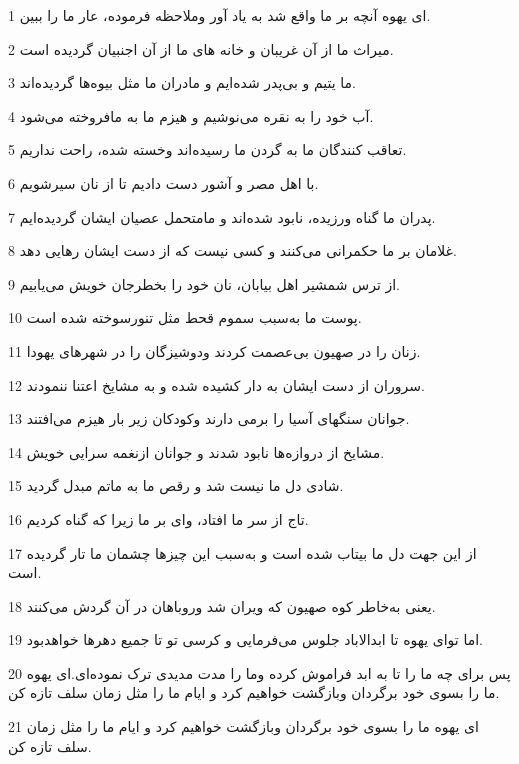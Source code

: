 \par 1 ای یهوه آنچه بر ما واقع شد به یاد آور وملاحظه فرموده، عار ما را ببین.
\par 2 میراث ما از آن غریبان و خانه های ما از آن اجنبیان گردیده است.
\par 3 ما یتیم و بی‌پدر شده‌ایم و مادران ما مثل بیوه‌ها گردیده‌اند.
\par 4 آب خود را به نقره می‌نوشیم و هیزم ما به مافروخته می‌شود.
\par 5 تعاقب کنندگان ما به گردن ما رسیده‌اند وخسته شده، راحت نداریم.
\par 6 با اهل مصر و آشور دست دادیم تا از نان سیرشویم.
\par 7 پدران ما گناه ورزیده، نابود شده‌اند و مامتحمل عصیان ایشان گردیده‌ایم.
\par 8 غلامان بر ما حکمرانی می‌کنند و کسی نیست که از دست ایشان رهایی دهد.
\par 9 از ترس شمشیر اهل بیابان، نان خود را بخطرجان خویش می‌یابیم.
\par 10 پوست ما به‌سبب سموم قحط مثل تنورسوخته شده است.
\par 11 زنان را در صهیون بی‌عصمت کردند ودوشیزگان را در شهرهای یهودا.
\par 12 سروران از دست ایشان به دار کشیده شده و به مشایخ اعتنا ننمودند.
\par 13 جوانان سنگهای آسیا را برمی دارند وکودکان زیر بار هیزم می‌افتند.
\par 14 مشایخ از دروازه‌ها نابود شدند و جوانان ازنغمه سرایی خویش.
\par 15 شادی دل ما نیست شد و رقص ما به ماتم مبدل گردید.
\par 16 تاج از سر ما افتاد، وای بر ما زیرا که گناه کردیم.
\par 17 از این جهت دل ما بیتاب شده است و به‌سبب این چیزها چشمان ما تار گردیده است.
\par 18 یعنی به‌خاطر کوه صهیون که ویران شد وروباهان در آن گردش می‌کنند.
\par 19 اما تو‌ای یهوه تا ابدالاباد جلوس می‌فرمایی و کرسی تو تا جمیع دهرها خواهدبود.
\par 20 پس برای چه ما را تا به ابد فراموش کرده وما را مدت مدیدی ترک نموده‌ای.‌ای یهوه ما را بسوی خود برگردان وبازگشت خواهیم کرد و ایام ما را مثل زمان سلف تازه کن.
\par 21 ‌ای یهوه ما را بسوی خود برگردان وبازگشت خواهیم کرد و ایام ما را مثل زمان سلف تازه کن.

